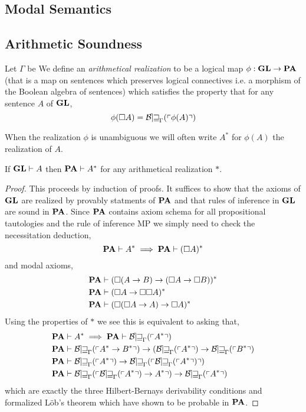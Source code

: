 \documentclass[12pt]{article}
\begin{document}
\subsection{Modal Semantics}

\subsection{Arithmetic Soundness}

\begin{definition}
Let $\Gamma$ be We define an \textit{arithmetical realization} to be a logical map $\phi : \mathbf{GL} \to \mathbf{PA}$ (that is a map on sentences which preserves logical connectives i.e. a morphism of the Boolean algebra of sentences) which satisfies the property that for any sentence $A$ of $\mathbf{GL}$,
\[ \phi(\square A) = \operatorname{\mathcal{B\mkern-2.0mu e\mkern-2.0mu w\mkern-1mu}}_{\Gamma}(\left\ulcorner \phi(A) \right\urcorner) \]
\end{definition}

\begin{remark}
When the realization $\phi$ is unambiguous we will often write $A^*$ for $\phi(A)$ the realization of $A$.
\end{remark}

\begin{theorem}
If $\mathbf{GL} \vdash A$ then $\mathbf{PA} \vdash A^*$ for any arithmetical realization $*$.
\end{theorem}

\begin{proof}
This proceeds by induction of proofs. It suffices to show that the axioms of $\mathbf{GL}$ are realized by provably statments of $\mathbf{PA}$ and that rules of inference in $\mathbf{GL}$ are sound in $\mathbf{PA}$. Since $\mathbf{PA}$ contains axiom schema for all propositional tautologies and the rule of inference MP we simply need to check the necessitation deduction,
\[ \mathbf{PA} \vdash A^* \implies \mathbf{PA} \vdash (\square A)^* \]
and modal axioms,
\begin{align*}
\mathbf{PA} & \vdash (\square (A \to B) \to (\square A \to \square B))^* 
\\
\mathbf{PA} & \vdash (\square A \to \square \square A)^*
\\
\mathbf{PA} & \vdash (\square (\square A \to A) \to \square A)^* 
\end{align*}
Using the properties of $*$ we see this is equivalent to asking that,
\begin{align*}
\PA & \proves A^* \implies \PA \proves \Thm{A^*}
\\
\PA & \proves \Thm{A^* \to B^*} \to (\Thm{A^*} \to \Thm{B^*}
\\
\PA & \proves \Thm{A^*} \to \Thm{\Thm{A^*}}
\\
\PA & \proves \Thm{\Thm{A^*} \to A^*} \to \Thm{A^*} 
\end{align*}
which are exactly the three Hilbert-Bernays derivability conditions and formalized L\"{o}b's theorem which have shown to be probable in $\mathbf{PA}$. 
\end{proof}
\end{document}
